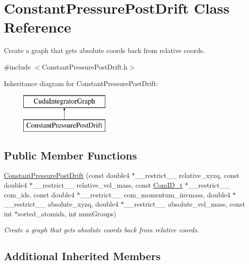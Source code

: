 \hypertarget{classConstantPressurePostDrift}{}\section{Constant\+Pressure\+Post\+Drift Class Reference}
\label{classConstantPressurePostDrift}


Create a graph that gets absolute coords back from relative coords.  




{\ttfamily \#include $<$Constant\+Pressure\+Post\+Drift.\+h$>$}

Inheritance diagram for Constant\+Pressure\+Post\+Drift\+:\begin{figure}[H]
\begin{center}
\leavevmode
\includegraphics[height=2.000000cm]{classConstantPressurePostDrift}
\end{center}
\end{figure}
\subsection*{Public Member Functions}
\begin{DoxyCompactItemize}
\item 
\hyperlink{classConstantPressurePostDrift_ac04e5c4bcbd6f48169085138a157c2e8}{Constant\+Pressure\+Post\+Drift} (const double4 $\ast$\+\_\+\+\_\+restrict\+\_\+\+\_\+ relative\+\_\+xyzq, const double4 $\ast$\+\_\+\+\_\+restrict\+\_\+\+\_\+ relative\+\_\+vel\+\_\+mass, const \hyperlink{structComID__t}{Com\+I\+D\+\_\+t} $\ast$\+\_\+\+\_\+restrict\+\_\+\+\_\+ com\+\_\+ids, const double4 $\ast$\+\_\+\+\_\+restrict\+\_\+\+\_\+ com\+\_\+momentum\+\_\+invmass, double4 $\ast$\+\_\+\+\_\+restrict\+\_\+\+\_\+ absolute\+\_\+xyzq, double4 $\ast$\+\_\+\+\_\+restrict\+\_\+\+\_\+ absolute\+\_\+vel\+\_\+mass, const int $\ast$sorted\+\_\+atomids, int num\+Groups)
\begin{DoxyCompactList}\small\item\em Create a graph that gets absolute coords back from relative coords. \end{DoxyCompactList}\end{DoxyCompactItemize}
\subsection*{Additional Inherited Members}


